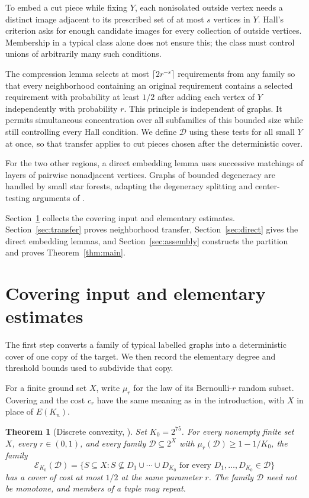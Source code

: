 \documentclass[11pt]{article}
\newtheorem{theorem}{Theorem}[section]
\theoremstyle{remark}
\numberwithin{equation}{section}
\newcommand{\calD}{\mathcal D}
\begin{document}
To embed a cut piece while fixing $Y$, each nonisolated outside
vertex needs a distinct image adjacent to its prescribed set of
at most $s$ vertices in $Y$. Hall's criterion asks for enough
candidate images for every collection of outside vertices.
Membership in a typical class alone does not ensure this; the
class must control unions of arbitrarily many such conditions.

The compression lemma selects at most $\lceil2r^{-s}\rceil$
requirements from any family so that every neighborhood containing
an original requirement contains a selected requirement with
probability at least $1/2$ after adding each vertex of $Y$
independently with probability $r$. This principle is independent
of graphs. It permits simultaneous concentration over all
subfamilies of this bounded size while still controlling every
Hall condition. We define $\calD$ using these tests for all small
$Y$ at once, so that transfer applies to cut pieces chosen after
the deterministic cover.

For the two other regions, a direct embedding lemma uses successive
matchings of layers of pairwise nonadjacent vertices. Graphs of
bounded degeneracy are handled by small star forests, adapting
the degeneracy splitting and center-testing arguments of
\cite[Claim~3.9 and Section~6]{AHPT26}.

Section~\ref{sec:prelim}
collects the covering input and elementary estimates.
Section~\ref{sec:transfer} proves neighborhood transfer,
Section~\ref{sec:direct} gives the direct embedding lemmas,
and Section~\ref{sec:assembly} constructs the partition and
proves Theorem~\ref{thm:main}.

\section{Covering input and elementary estimates}
\label{sec:prelim}

The first step converts a family of typical labelled graphs into
a deterministic cover of one copy of the target. We then record
the elementary degree and threshold bounds used to subdivide that
copy.

For a finite ground set $X$, write $\mu_r$ for the law of its
Bernoulli-$r$ random subset. Covering and the cost $c_r$ have the
same meaning as in the introduction, with $X$ in place of $E(K_n)$.

\begin{theorem}[Discrete convexity, {\cite[Theorem~1.1]{OpenAI26DC}}]
\label{thm:discrete}
Set $K_0=2^{75}$. For every nonempty finite set $X$, every
$r\in(0,1)$, and every family $\calD\subseteq2^X$ with
$\mu_r(\calD)\geq1-1/K_0$, the family
\[
 \mathcal E_{K_0}(\calD)=
 \{S\subseteq X:S\not\subseteq D_1\cup\cdots\cup D_{K_0}
                   \text{ for every }D_1,\ldots,D_{K_0}\in\calD\}
\]
has a cover of cost at most $1/2$ at the same parameter $r$.
The family $\calD$ need not be monotone, and members of a tuple
may repeat.
\end{theorem}
\end{document}

